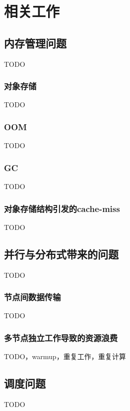
\chapter{相关工作}

\section{内存管理问题}
TODO
\subsection{对象存储}
TODO

\subsection{OOM}
TODO

\subsection{GC}
TODO

\subsection{对象存储结构引发的cache-miss}
TODO


\section{并行与分布式带来的问题}
TODO

\subsection{节点间数据传输}
TODO

\subsection{多节点独立工作导致的资源浪费}
TODO，warmup，重复工作，重复计算

\section{调度问题}
TODO




